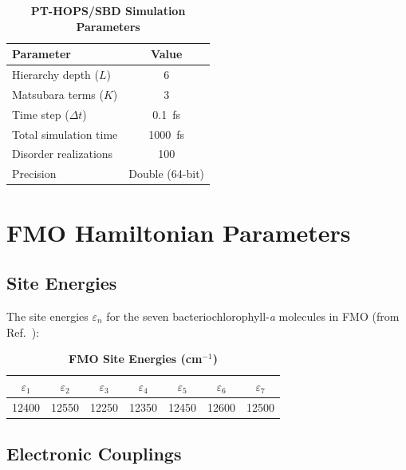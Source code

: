 \documentclass[11pt,a4paper]{article}
\begin{document}
\begin{table}[h]
\centering
\caption{\textbf{PT-HOPS/SBD Simulation Parameters}}
\label{tab:SI_parameters}
\begin{tabular}{lc}
\toprule
\textbf{Parameter} & \textbf{Value} \\
\midrule
Hierarchy depth ($L$) & 6 \\
Matsubara terms ($K$) & 3 \\
Time step ($\Delta t$) & \SI{0.1}{\femto\second} \\
Total simulation time & \SI{1000}{\femto\second} \\
Disorder realizations & 100 \\
Precision & Double (64-bit) \\
\bottomrule
\end{tabular}
\end{table}


\section{FMO Hamiltonian Parameters}

\subsection{Site Energies}

The site energies $\varepsilon_n$ for the seven bacteriochlorophyll-\textit{a} molecules in FMO (from Ref.\ \cite{Adolphs2006}):

\begin{table}[h]
\centering
\caption{\textbf{FMO Site Energies (cm$^{-1}$)}}
\label{tab:SI_site_energies}
\begin{tabular}{ccccccc}
\toprule
$\varepsilon_1$ & $\varepsilon_2$ & $\varepsilon_3$ & $\varepsilon_4$ & $\varepsilon_5$ & $\varepsilon_6$ & $\varepsilon_7$ \\
\midrule
12400 & 12550 & 12250 & 12350 & 12450 & 12600 & 12500 \\
\bottomrule
\end{tabular}
\end{table}

\subsection{Electronic Couplings}
\end{document}
